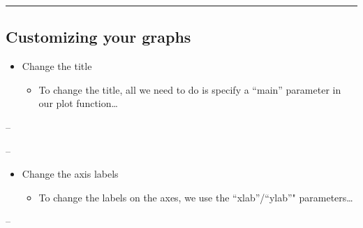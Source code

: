 \documentclass[]{article}
\newenvironment{Shaded}{\begin{snugshade}}{\end{snugshade}}
\newcommand{\DataTypeTok}[1]{\textcolor[rgb]{0.13,0.29,0.53}{#1}}
\newcommand{\KeywordTok}[1]{\textcolor[rgb]{0.13,0.29,0.53}{\textbf{#1}}}
\newcommand{\NormalTok}[1]{#1}
\newcommand{\OperatorTok}[1]{\textcolor[rgb]{0.81,0.36,0.00}{\textbf{#1}}}
\newcommand{\StringTok}[1]{\textcolor[rgb]{0.31,0.60,0.02}{#1}}
\providecommand{\tightlist}{%
  \setlength{\itemsep}{0pt}\setlength{\parskip}{0pt}}
\begin{document}
\begin{center}\rule{0.5\linewidth}{\linethickness}\end{center}

\hypertarget{customizing-your-graphs-1}{%
\subsection{Customizing your graphs}\label{customizing-your-graphs-1}}

\begin{itemize}
\tightlist
\item
  Change the title

  \begin{itemize}
  \tightlist
  \item
    To change the title, all we need to do is specify a ``main''
    parameter in our plot function\ldots{}
  \end{itemize}
\end{itemize}

--

\begin{Shaded}
\end{Shaded}

--

\begin{itemize}
\tightlist
\item
  Change the axis labels

  \begin{itemize}
  \tightlist
  \item
    To change the labels on the axes, we use the ``xlab''/``ylab''"
    parameters\ldots{}
  \end{itemize}
\end{itemize}

--

\begin{Shaded}
\end{Shaded}
\end{document}
